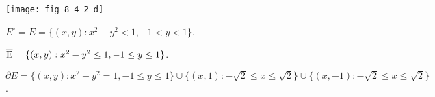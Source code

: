\begin{Exercise}
\begin{enumerate}[a)]
\begin{sketch}
\begin{minipage}[h]{\textwidth}
\centering
\texttt{[image: fig\_8\_4\_2\_d]}
\label{fig:8.4.2_d}
\end{minipage}

$E^\circ = E = \{(x,y):x^2-y^2<1,-1<y<1\}$.

$\overline{\rm E} =  \{(x,y):x^2-y^2\leq 1,-1\leq y\leq 1\}$.

$\partial E = \{(x,y):x^2-y^2 = 1,-1\leq y\leq 1\} \cup \{(x,1):-\sqrt{2}\leq x \leq \sqrt{2}\} \cup \{(x,-1):-\sqrt{2}\leq x \leq \sqrt{2}\}$.
\end{sketch}

\end{enumerate}
\end{Exercise}